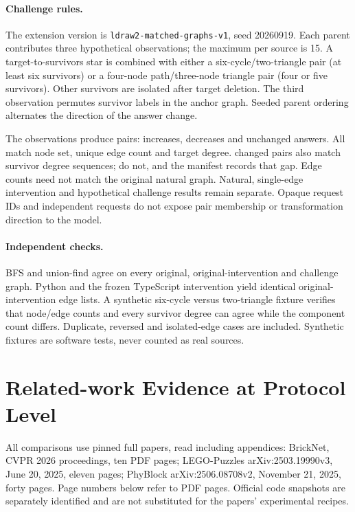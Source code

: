 \documentclass[10pt,letterpaper]{article}
\begin{document}
\paragraph{Challenge rules.}
The extension version is \texttt{ldraw2-matched-graphs-v1}, seed
20260919. Each parent contributes three hypothetical observations;
the maximum per source is 15. A target-to-survivors star is combined
with either a six-cycle/two-triangle pair (at least six survivors)
or a four-node path/three-node triangle pair (four or five survivors).
Other survivors are isolated after target deletion. The third
observation permutes survivor labels in the anchor graph.
Seeded parent ordering alternates the direction of the answer change.

The \EvChallengeObs{} observations produce \EvChallengePairs{}
pairs: \EvChallengeUp{} increases, \EvChallengeDown{} decreases and
\EvChallengeSame{} unchanged answers. All match node set, unique edge
count and target degree. \EvDegreeMatched{} changed pairs also match survivor
degree sequences; \EvDegreeGaps{} do not, and the manifest records that gap.
Edge counts need not match the original natural graph. Natural,
single-edge intervention and hypothetical challenge results remain
separate. Opaque request IDs and independent requests do not expose
pair membership or transformation direction to the model.

\paragraph{Independent checks.}
BFS and union-find agree on every original, original-intervention and
challenge graph. Python and the frozen TypeScript intervention yield
identical original-intervention edge lists. A synthetic six-cycle
versus two-triangle fixture verifies that node/edge counts and every
survivor degree can agree while the component count differs.
Duplicate, reversed and isolated-edge cases are included.
Synthetic fixtures are software tests, never counted as real sources.

\clearpage
\section{Related-work Evidence at Protocol Level}
All comparisons use pinned full papers, read including appendices:
BrickNet, CVPR 2026 proceedings, ten PDF pages;
LEGO-Puzzles arXiv:2503.19990v3, June 20, 2025, eleven pages;
PhyBlock arXiv:2506.08708v2, November 21, 2025, forty pages.
Page numbers below refer to PDF pages. Official code snapshots are
separately identified and are not substituted for the papers'
experimental recipes.
\end{document}
